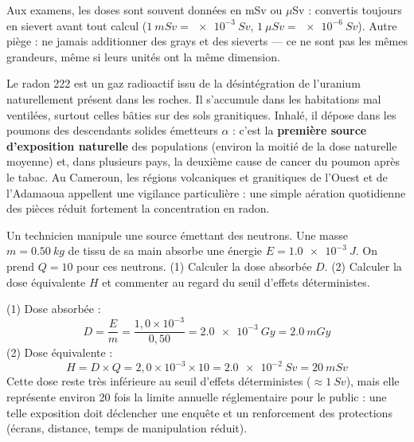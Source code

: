 \documentclass[11pt]{article}
\newcommand{\cle}[1]{{\popxbold\color{popdark}#1}}
\begin{document}
\begin{attention}
Aux examens, les doses sont souvent données en mSv ou $\mu$Sv : convertis toujours en sievert avant tout calcul ($\SI{1}{mSv} = \SI{e-3}{Sv}$, $\SI{1}{\mu Sv} = \SI{e-6}{Sv}$). Autre piège : ne jamais additionner des grays et des sieverts — ce ne sont pas les mêmes grandeurs, même si leurs unités ont la même dimension.
\end{attention}

\begin{savaistu}
Le \cle{radon} 222 est un gaz radioactif issu de la désintégration de l'uranium naturellement présent dans les roches. Il s'accumule dans les habitations mal ventilées, surtout celles bâties sur des sols granitiques. Inhalé, il dépose dans les poumons des descendants solides émetteurs $\alpha$ : c'est la \textbf{première source d'exposition naturelle} des populations (environ la moitié de la dose naturelle moyenne) et, dans plusieurs pays, la deuxième cause de cancer du poumon après le tabac. Au Cameroun, les régions volcaniques et granitiques de l'Ouest et de l'Adamaoua appellent une vigilance particulière : une simple aération quotidienne des pièces réduit fortement la concentration en radon.
\end{savaistu}

\begin{exercice}
Un technicien manipule une source émettant des neutrons. Une masse $m = \SI{0,50}{kg}$ de tissu de sa main absorbe une énergie $E = \SI{1,0e-3}{J}$. On prend $Q = 10$ pour ces neutrons. (1) Calculer la dose absorbée $D$. (2) Calculer la dose équivalente $H$ et commenter au regard du seuil d'effets déterministes.
\end{exercice}

\begin{corrige}
(1) Dose absorbée :
\[ D = \dfrac{E}{m} = \dfrac{1{,}0 \times 10^{-3}}{0{,}50} = \SI{2,0e-3}{Gy} = \SI{2,0}{mGy} \]
(2) Dose équivalente :
\[ H = D \times Q = 2{,}0 \times 10^{-3} \times 10 = \SI{2,0e-2}{Sv} = \SI{20}{mSv} \]
Cette dose reste très inférieure au seuil d'effets déterministes ($\approx \SI{1}{Sv}$), mais elle représente environ 20 fois la limite annuelle réglementaire pour le public : une telle exposition doit déclencher une enquête et un renforcement des protections (écrans, distance, temps de manipulation réduit).
\end{corrige}
\end{document}
